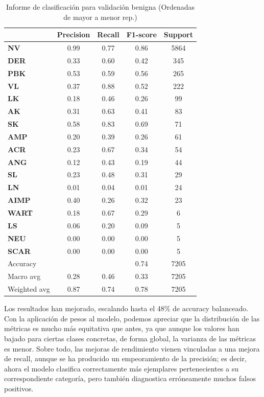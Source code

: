\begin{table}[!ht]
	\centering
	\begin{tabular}{|l|c|c|c|c|}
		\hline
		& Precision & Recall & F1-score & Support \\
		\hline
	\textbf{NV} & 0.99 & 0.77 & 0.86 & 5864 \\ \hline
	\textbf{DER} & 0.33 & 0.60 & 0.42 & 345 \\ \hline
	\textbf{PBK} & 0.53 & 0.59 & 0.56 & 265 \\ \hline
	\textbf{VL} & 0.37 & 0.88 & 0.52 & 222 \\ \hline
	\textbf{LK} & 0.18 & 0.46 & 0.26 & 99 \\ \hline
	\textbf{AK} & 0.31 & 0.63 & 0.41 & 83 \\ \hline
	\textbf{SK} & 0.58 & 0.83 & 0.69 & 71 \\ \hline
	\textbf{AMP} & 0.20 & 0.39 & 0.26 & 61 \\ \hline
	\textbf{ACR} & 0.23 & 0.67 & 0.34 & 54 \\ \hline
	\textbf{ANG} & 0.12 & 0.43 & 0.19 & 44 \\ \hline
	\textbf{SL} & 0.23 & 0.48 & 0.31 & 29 \\ \hline
	\textbf{LN} & 0.01 & 0.04 & 0.01 & 24 \\ \hline
	\textbf{AIMP} & 0.40 & 0.26 & 0.32 & 23 \\ \hline
	\textbf{WART} & 0.18 & 0.67 & 0.29 & 6 \\ \hline
	\textbf{LS} & 0.06 & 0.20 & 0.09 & 5 \\ \hline
	\textbf{NEU} & 0.00 & 0.00 & 0.00 & 5 \\ \hline
	\textbf{SCAR} & 0.00 & 0.00 & 0.00 & 5 \\ \hline
		\hline
		Accuracy &  &  & 0.74 & 7205 \\
		Macro avg & 0.28& 0.46& 0.33&7205\\
		Weighted avg&0.87&0.74&0.78&7205\\
		\hline
	\end{tabular}
	\caption{Informe de clasificación para validación benigna (Ordenadas de mayor a menor rep.)}
	\label{tab:benignomalmejormetrics}
\end{table}

Los resultados han mejorado, escalando hasta el 48\% de accuracy balanceado. Con la aplicación de pesos al modelo, podemos apreciar que la distribución de las métricas es mucho  más equitativa que antes, ya que aunque los valores han bajado para ciertas clases concretas, de forma global, la varianza de las métricas es menor. Sobre todo, las mejoras de rendimiento vienen vinculadas a una mejora de recall, aunque se ha producido un empeoramiento de la precisión; es decir, ahora el modelo clasifica correctamente más ejemplares pertenecientes a su correspondiente categoría, pero también diagnostica erróneamente muchos falsos positivos.

